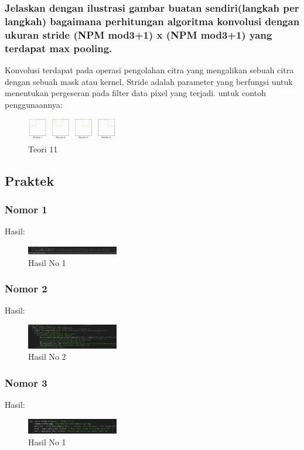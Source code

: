 \subsubsection{Jelaskan dengan ilustrasi gambar buatan sendiri(langkah per langkah) bagaimana perhitungan algoritma konvolusi dengan ukuran stride (NPM mod3+1) x (NPM mod3+1) yang terdapat max pooling.}	
\hfill\break
Konvolusi terdapat pada operasi pengolahan citra yang mengalikan sebuah citra dengan sebuah mask atau kernel, Stride adalah parameter yang berfungsi untuk menentukan pergeseran pada filter data pixel yang terjadi. untuk contoh penggunaannya:
\begin{figure}[H]
\centering
	\includegraphics[width=4cm]{figures/1174053/7/11.jpg}
\caption{Teori 11}
\end{figure}



\subsection{Praktek}
\subsubsection{Nomor 1}
\hfill\break

Hasil:
\begin{figure}[H]
\centering
	\includegraphics[width=4cm]{figures/1174053/7/no1.jpg}
	\caption{Hasil No 1}
\end{figure}

\subsubsection{Nomor 2}
\hfill\break

Hasil:
\begin{figure}[H]
\centering
	\includegraphics[width=4cm]{figures/1174053/7/no2.jpg}
	\caption{Hasil No 2}
\end{figure}

\subsubsection{Nomor 3}
\hfill\break

Hasil:
\begin{figure}[H]
\centering
	\includegraphics[width=4cm]{figures/1174053/7/no3.jpg}
	\caption{Hasil No 1}
\end{figure}

